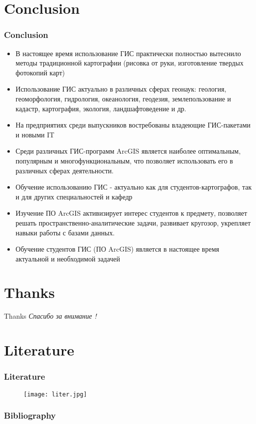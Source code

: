 \documentclass[pdflatex,compress,8pt,
	xcolor={dvipsnames,dvipsnames,svgnames,x11names,table},
	hyperref={	 
	pdfauthor={Lemenkova Polina}, 
	pdfsubject={Preentation}, 
	pdfcreator={Lemenkova Polina}, 
	pdfproducer={Lemenkova Polina}, 
	colorlinks=true,
	linkcolor=Red3, 
	citecolor=NavyBlue, 
	urlcolor = NavyBlue, 
	breaklinks = true}]{beamer}
\begin{document}
\section{Conclusion}
\begin{frame}\frametitle{Conclusion}
\begin{itemize}
	\item В настоящее время использование ГИС  практически полностью вытеснило методы 
традиционной картографии (рисовка от руки, изготовление твердых фотокопий карт)
	\item Использование ГИС актуально в различных сферах геонаук: геология, геоморфология, гидрология, 
 океанология, геодезия, землепользование и кадастр, картография, экология, ландшафтоведение и др.
	\item На предприятиях среди выпускников востребованы владеющие ГИС-пакетами и новыми IT
	\item Среди различных ГИС-программ ArcGIS является наиболее оптимальным, популярным и
многофункциональным, что позволяет использовать его в различных сферах деятельности.
	\item Обучение использованию ГИС - актуально как для студентов-картографов, так и для других
специальностей и кафедр
	\item Изучение ПО ArcGIS активизирует интерес студентов к предмету, позволяет решать пространственно-аналитические задачи, развивает кругозор, укрепляет навыки работы с базами данных.
	\item Обучение студентов ГИС (ПО ArcGIS)  является в настоящее время актуальной и необходимой задачей
\end{itemize}
\end{frame}

\section{Thanks}
\begin{frame}{Thanks}
  	\centering \LARGE 
	\emph{Спасибо за внимание !}
\end{frame}

\section{Literature}
\begin{frame}\frametitle{Literature}
\begin{figure}[H]
	\centering
		\texttt{[image: liter.jpg]}
\end{figure}
\end{frame}

\begin{frame}\frametitle{Bibliography}
	\nocite{*}
	\printbibliography[heading=none]
\end{frame}


\end{document}
